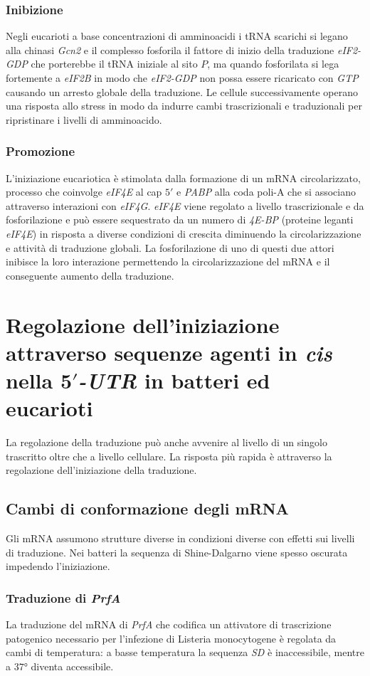 \subsubsection{Inibizione}
Negli eucarioti a base concentrazioni di amminoacidi i tRNA scarichi si legano alla chinasi \emph{Gcn2} e il complesso fosforila il fattore di inizio della traduzione \emph{eIF2-GDP} che porterebbe
il tRNA iniziale al sito $P$, ma quando fosforilata si lega fortemente a \emph{eIF2B} in modo che \emph{eIF2-GDP} non possa essere ricaricato con \emph{GTP} causando un arresto globale della traduzione.
Le cellule successivamente operano una risposta allo stress in modo da indurre cambi trascrizionali e traduzionali per ripristinare i livelli di amminoacido. 
\subsubsection{Promozione}
L'iniziazione eucariotica \`e stimolata dalla formazione di un mRNA circolarizzato, processo che coinvolge \emph{eIF4E} al cap $5'$ e \emph{PABP} alla coda poli-A che si associano attraverso interazioni
con \emph{eIF4G}. \emph{eIF4E} viene regolato a livello trascrizionale e da fosforilazione e pu\`o essere sequestrato da un numero di \emph{4E-BP} (proteine leganti \emph{eIF4E}) in risposta a diverse
condizioni di crescita diminuendo la circolarizzazione e attivit\`a di traduzione globali. La fosforilazione di uno di questi due attori inibisce la loro interazione permettendo la circolarizzazione del
mRNA e il conseguente aumento della traduzione.
\section{Regolazione dell'iniziazione attraverso sequenze agenti in \emph{cis} nella \emph{$\mathbf{5'}$-UTR} in batteri ed eucarioti}
La regolazione della traduzione pu\`o anche avvenire al livello di un singolo trascritto oltre che a livello cellulare. La risposta pi\`u rapida \`e attraverso la regolazione dell'iniziazione della
traduzione. 
\subsection{Cambi di conformazione degli mRNA}
Gli mRNA assumono strutture diverse in condizioni diverse con effetti sui livelli di traduzione. Nei batteri la sequenza di Shine-Dalgarno viene spesso oscurata impedendo l'iniziazione. 
\subsubsection{Traduzione di \emph{PrfA}}
La traduzione del mRNA di \emph{PrfA} che codifica un attivatore di trascrizione patogenico necessario per l'infezione di Listeria monocytogene \`e regolata da cambi di temperatura: a basse temperatura
la sequenza \emph{SD} \`e inaccessibile, mentre a $37\si{\degree}$ diventa accessibile.
